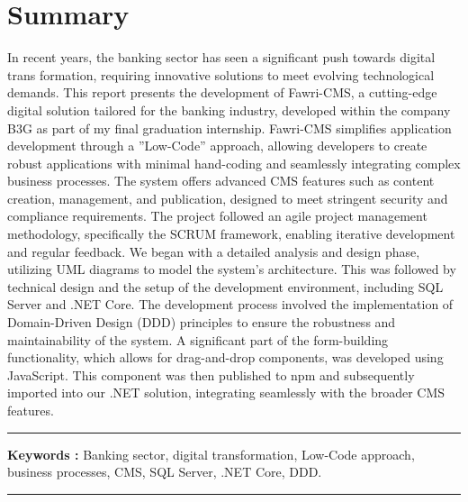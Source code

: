 \chapter*{Summary}

\hspace{\parindent}  In recent years, the banking sector has seen a significant push towards digital trans
formation, requiring innovative solutions to meet evolving technological demands. This report presents the development of Fawri-CMS, a cutting-edge digital solution tailored for the banking industry, developed within the company B3G as part of my final graduation internship.
Fawri-CMS simplifies application development through a ”Low-Code” approach, allowing developers to create robust applications with minimal hand-coding and seamlessly integrating complex business processes. The system offers advanced CMS features such as content creation, management, and publication, designed to meet stringent security and compliance requirements.
The project followed an agile project management methodology, specifically the SCRUM
framework, enabling iterative development and regular feedback. We began with a detailed analysis and design phase, utilizing UML diagrams to model the system’s architecture. This was followed by technical design and the setup of the development environment, including SQL Server and .NET Core.
The development process involved the implementation of Domain-Driven Design (DDD) principles to ensure the robustness and maintainability of the system. A significant part of the form-building functionality, which allows for drag-and-drop components, was developed using JavaScript. This component was then published to npm and subsequently imported into our .NET solution, integrating seamlessly with the broader CMS features.

\noindent\rule[2pt]{\textwidth}{0.5pt}

{\textbf{Keywords :}}
Banking sector, digital transformation, Low-Code approach, business
processes, CMS, SQL Server, .NET Core, DDD.
\\
\noindent\rule[2pt]{\textwidth}{0.5pt}
